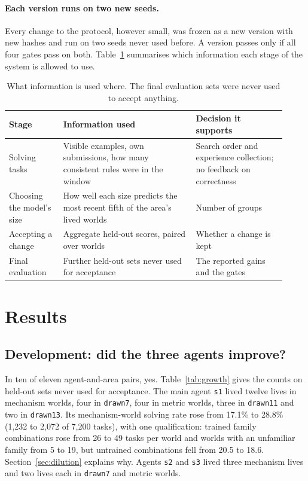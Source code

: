 \documentclass[11pt]{article}
\begin{document}
\paragraph{Each version runs on two new seeds.} Every change to the protocol, however small, was frozen as a new version with new hashes and run on two seeds never used before. A version passes only if all four gates pass on both. Table~\ref{tab:evidence} summarises which information each stage of the system is allowed to use.

\begin{table}[h]
\centering
\caption{What information is used where. The final evaluation sets were never used to accept anything.}
\label{tab:evidence}
\small
\begin{tabular}{p{0.18\linewidth}p{0.44\linewidth}p{0.3\linewidth}}
\toprule
Stage & Information used & Decision it supports \\
\midrule
Solving tasks & Visible examples, own submissions, how many consistent rules were in the window & Search order and experience collection; no feedback on correctness \\
Choosing the model's size & How well each size predicts the most recent fifth of the area's lived worlds & Number of groups \\
Accepting a change & Aggregate held-out scores, paired over worlds & Whether a change is kept \\
Final evaluation & Further held-out sets never used for acceptance & The reported gains and the gates \\
\bottomrule
\end{tabular}
\end{table}

\section{Results}

\subsection{Development: did the three agents improve?}

In ten of eleven agent-and-area pairs, yes. Table~\ref{tab:growth} gives the counts on held-out sets never used for acceptance. The main agent \texttt{s1} lived twelve lives in mechanism worlds, four in \texttt{drawn7}, four in metric worlds, three in \texttt{drawn11} and two in \texttt{drawn13}. Its mechanism-world solving rate rose from 17.1\% to 28.8\% (1,232 to 2,072 of 7,200 tasks), with one qualification: trained family combinations rose from 26 to 49 tasks per world and worlds with an unfamiliar family from 5 to 19, but untrained combinations fell from 20.5 to 18.6. Section~\ref{sec:dilution} explains why. Agents \texttt{s2} and \texttt{s3} lived three mechanism lives and two lives each in \texttt{drawn7} and metric worlds.
\end{document}
